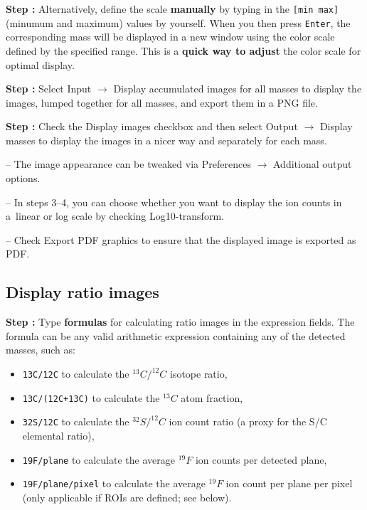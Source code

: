 \documentclass[a4paper, 11pt]{article}
\newcommand{\ttt}[1]{\texttt{#1}}
\newcommand{\lans}[1]{{\color{magenta}#1}}
\newcommand{\lanscb}[1]{{\color{darkgreen}#1}}
\newcommand{\lanstf}[1]{{\color{cyan}#1}}
\newcommand\ra{\rightarrow}
\newcommand\addon[1]{-- {\small #1}}
\newcounter{step}
\newcommand\s{\addtocounter{step}{1}\noindent\textbf{Step \thestep:}{ }}
\newcommand\bb[1]{\textbf{#1}}
\begin{document}
\s Alternatively, define the scale \bb{manually} by typing in the \ttt{[min max]} (minumum and maximum) values by yourself. When you then press \ttt{Enter}, the corresponding mass will be displayed in a new window using the color scale defined by the specified range. This is a \bb{quick way to adjust} the color scale for optimal display.

\s Select \lans{Input} $\ra$ \lans{Display accumulated images for all masses} to display the images, lumped together for all masses, and
export them in a PNG file.

\s Check the \lanscb{Display images} checkbox and then select \lans{Output} $\ra$ \lans{Display masses} to display the images in a nicer way and separately for each mass. 

\addon{The image appearance can be tweaked via \lans{Preferences} $\ra$ \lans{Additional output options}.}

\addon{In steps 3--4, you can choose whether you want to display the ion counts in a~linear or log scale by checking \lanscb{Log10-transform}.}

\addon{Check \lanscb{Export PDF graphics} to ensure that the displayed image is exported as PDF.}


\subsection{Display ratio images}
\setcounter{step}{0}

\s Type \bb{formulas} for calculating ratio images in the  \lanstf{expression} fields. The formula can be any valid arithmetic expression containing any of the detected masses, such as:

\begin{itemize}
\item \ttt{13C/12C} to calculate the $^{13}C/^{12}C$ isotope ratio,
\item \ttt{13C/(12C+13C)} to calculate the $^{13}C$ atom fraction,
\item \ttt{32S/12C} to calculate the $^{32}S/^{12}C$ ion count ratio (a proxy for the S/C elemental ratio), 
\item \ttt{19F/plane} to calculate the average $^{19}F$ ion counts per detected plane, 
\item \ttt{19F/plane/pixel} to calculate the average $^{19}F$ ion count per plane per pixel (only applicable if ROIs are defined; see below).
\end{itemize}
\end{document}
